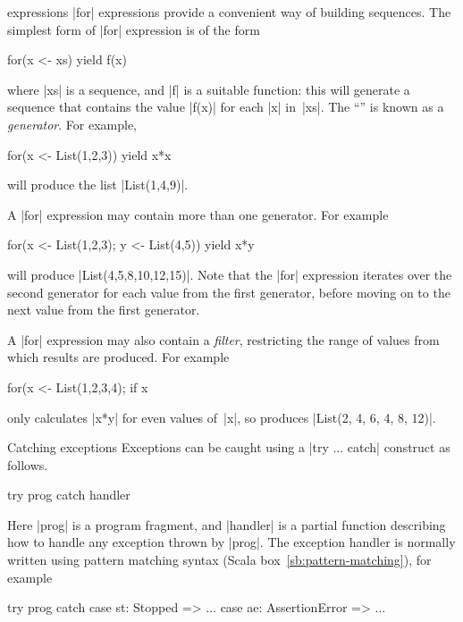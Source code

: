 
\begin{scalaBox}{\protect{} expressions}
\label{sb:for-expressions}
|for| expressions provide a convenient way of building sequences.  The
simplest form of |for| expression is of the form
\begin{scala}
  for(x <- xs) yield f(x)
\end{scala}
where |xs| is a sequence, and |f| is a suitable function: this will generate a
sequence that contains the value |f(x)| for each |x| in~|xs|.  The ``'' is known as a \emph{generator}.  For example, 
\begin{scala}
  for(x <- List(1,2,3)) yield x*x
\end{scala}
will produce the list |List(1,4,9)|.

A |for| expression may contain more than one generator.  For example
\begin{scala}
  for(x <- List(1,2,3); y <- List(4,5)) yield x*y
\end{scala}
will produce |List(4,5,8,10,12,15)|.  Note that the |for| expression iterates
over the second generator for each value from the first generator, before
moving on to the next value from the first generator.

A |for| expression may also contain a \emph{filter}, restricting the range of
values from which results are produced.  For example
\begin{scala}
  for(x <- List(1,2,3,4); if x%
\end{scala}
only calculates |x*y| for even values of~|x|, so produces
|List(2, 4, 6, 4, 8, 12)|.

\end{scalaBox}


\begin{scalaBox}{Catching exceptions}
\label{sb:try-catch}
Exceptions can be caught using a |try ... catch| construct as follows. 
\begin{scala}
try{ prog }catch{ handler }
\end{scala}
%
Here |prog| is a program fragment, and |handler| is a partial function
describing how to handle any exception thrown by |prog|.  The exception
handler is normally written using pattern matching syntax (Scala
box~\ref{sb:pattern-matching}), for example
\begin{scala}
  try{ prog } catch{
    case st: Stopped => ...
    case ae: AssertionError => ...
  }
\end{scala}
\end{scalaBox}


